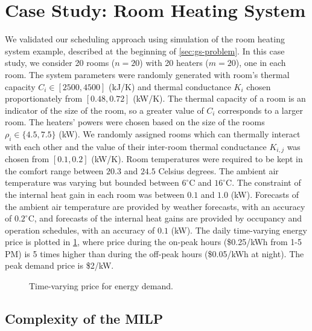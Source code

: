 \section{Case Study: Room Heating System}
\label{sec:simulation}

We validated our scheduling approach using simulation of the room heating system example, described at the beginning of \cref{sec:gs-problem}.
In this case study, we consider 20 rooms ($n=20$) with 20 heaters ($m=20$), one in each room.
The system parameters were randomly generated with room's thermal capacity $C_i \in [2500, 4500]$ (kJ/K) and thermal conductance $K_i$ chosen proportionately from $[0.48,0.72]$ (kW/K).
The thermal capacity of a room is an indicator of the size of the room, so a greater value of $C_{i}$ corresponds to a larger room.
The heaters' powers were chosen based on the size of the rooms $\rho_i \in \{4.5, 7.5\}$ (kW).
We randomly assigned rooms which can thermally interact with each other and the value of their inter-room thermal conductance $K_{i,j}$ was chosen from $[0.1,0.2]$ (kW/K). %
Room temperatures were required to be kept in the comfort range between $20.3$ and $24.5$ Celsius degrees.
The ambient air temperature was varying but bounded between $6^{\circ}\mathrm{C}$ and $16^{\circ}\mathrm{C}$. 
The constraint of the internal heat gain in each room was between $0.1$ and $1.0$ (kW).
Forecasts of the ambient air temperature are provided by weather forecasts, with an accuracy of $0.2^{\circ}\mathrm{C}$, and forecasts of the internal heat gains are provided by occupancy and operation schedules, with an accuracy of $0.1$ (kW).
The daily time-varying energy price is plotted in \cref{fig:simulation:price}, where %
 price during the on-peak hours (\$0.25/kWh from 1-5 PM) is 5 times higher than during the off-peak hours (\$0.05/kWh at night).
The peak demand price is \$2/kW.

\begin{figure}[tb]
  \centering
  
 \vspace{-8pt}
  \caption{Time-varying price for energy demand.}
  \vspace{-8pt}
  \label{fig:simulation:price}
\end{figure}


\subsection{Complexity of the MILP} %
\label{sec:simulation:milp}

